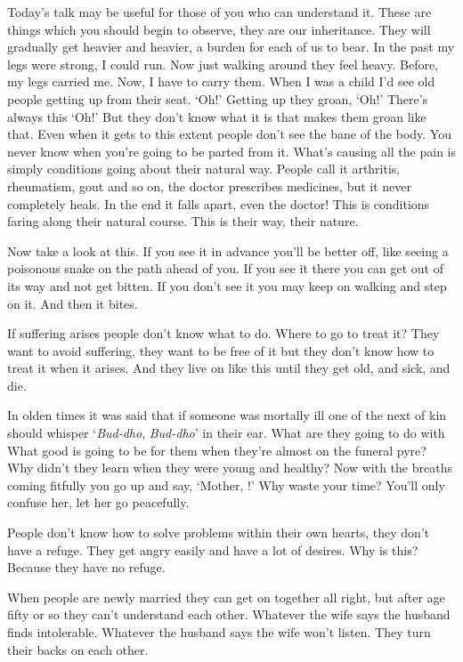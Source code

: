 Today's talk may be useful for those of you who can understand it. These are things which you should begin to observe, they are our inheritance. They will gradually get heavier and heavier, a burden for each of us to bear. In the past my legs were strong, I could run. Now just walking around they feel heavy. Before, my legs carried me. Now, I have to carry them. When I was a child I'd see old people getting up from their seat. `Oh!' Getting up they groan, `Oh!' There's always this `Oh!' But they don't know what it is that makes them groan like that. Even when it gets to this extent people don't see the bane of the body. You never know when you're going to be parted from it. What's causing all the pain is simply conditions going about their natural way. People call it arthritis, rheumatism, gout and so on, the doctor prescribes medicines, but it never completely heals. In the end it falls apart, even the doctor! This is conditions faring along their natural course. This is their way, their nature. 

Now take a look at this. If you see it in advance you'll be better off, like seeing a poisonous snake on the path ahead of you. If you see it there you can get out of its way and not get bitten. If you don't see it you may keep on walking and step on it. And then it bites. 

If suffering arises people don't know what to do. Where to go to treat it? They want to avoid suffering, they want to be free of it but they don't know how to treat it when it arises. And they live on like this until they get old, and sick, and die.

In olden times it was said that if someone was mortally ill one of the next of kin should whisper `\textit{Bud-dho}, \textit{Bud-dho}' in their ear. What are they going to do with  What good is  going to be for them when they're almost on the funeral pyre? Why didn't they learn  when they were young and healthy? Now with the breaths coming fitfully you go up and say, `Mother, !' Why waste your time? You'll only confuse her, let her go peacefully. 

People don't know how to solve problems within their own hearts, they don't have a refuge. They get angry easily and have a lot of desires. Why is this? Because they have no refuge. 

When people are newly married they can get on together all right, but after age fifty or so they can't understand each other. Whatever the wife says the husband finds intolerable. Whatever the husband says the wife won't listen. They turn their backs on each other. 

